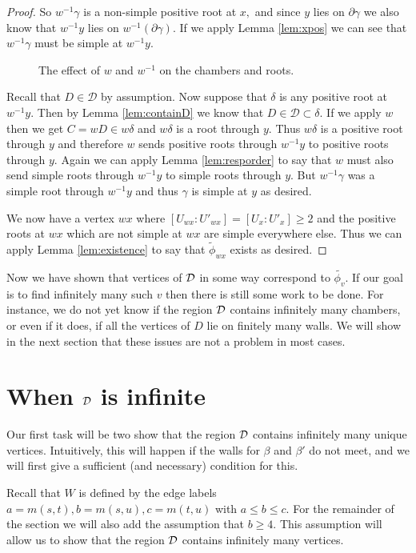 \documentclass[class=book, crop=false,12 pt]{standalone}
\begin{document}
\begin{proof}
So $w^{-1}\gamma$ is a non-simple positive root at $x,$ and since $y$ lies on $\partial \gamma$ we also know that $w^{-1}y$ lies on $w^{-1}(\partial \gamma).$ If we apply Lemma \ref{lem:xpos} we can see that $w^{-1}\gamma$ must be simple at $w^{-1}y.$ 
\begin{figure}[h]
	\label{fig:mappicture}
\caption{The effect of $w$ and $w^{-1}$ on the chambers and roots.}
\end{figure}


Recall that $D\in \mathcal{D}$ by assumption. Now suppose that $\delta$ is any positive root at $w^{-1}y.$ Then by Lemma \ref{lem:containD} we know that $D\in \mathcal{D}\subset \delta.$ If we apply $w$ then we get $C=wD\in w\delta$ and $w\delta$ is a root through $y.$ Thus $w\delta$ is a positive root through $y$ and therefore $w$ sends positive roots through $w^{-1}y$ to positive roots through $y.$ Again we can apply Lemma \ref{lem:resporder} to say that $w$ must also send simple roots through $w^{-1}y$ to simple roots through $y.$ But $w^{-1}\gamma$ was a simple root through $w^{-1}y$ and thus $\gamma$ is simple at $y$ as desired.

We now have a vertex $wx$ where $[U_{wx}:U'_{wx}]=[U_x:U'_x]\ge 2$ and the positive roots at $wx$ which are not simple at $wx$ are simple everywhere else. Thus we can apply Lemma \ref{lem:existence} to say that $\tilde{\phi}_{wx}$ exists as desired.
\end{proof}

Now we have shown that vertices of $\mathcal{D}$ in some way correspond to $\tilde{\phi_v}.$ If our goal is to find infinitely many such $v$ then there is still some work to be done. For instance, we do not yet know if the region $\mathcal{D}$ contains infinitely many chambers, or even if it does, if all the vertices of $D$ lie on finitely many walls. We will show in the next section that these issues are not a problem in most cases.


\section{When $\mathcal{D}$ is infinite}
Our first task will be two show that the region $\mathcal{D}$ contains infinitely many unique vertices. Intuitively, this will happen if the walls for $\beta$ and $\beta'$ do not meet, and we will first give a sufficient (and necessary) condition for this.

Recall that $W$ is defined by the edge labels $a=m(s,t),b=m(s,u),c=m(t,u)$ with $a\le b \le c.$ For the remainder of the section we will also add the assumption that $b\ge 4.$ This assumption will allow us to show that the region $\mathcal{D}$ contains infinitely many vertices.
\end{document}

